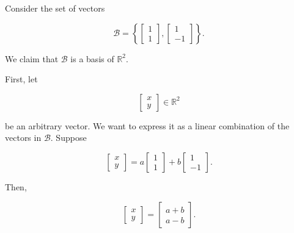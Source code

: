 \begin{example}
	Consider the set of vectors

	\begin{equation}
		\mathcal{B}
		=
		\left\{
		\begin{bmatrix}
			1 \\
			1
		\end{bmatrix},
		\begin{bmatrix}
			1 \\
			-1
		\end{bmatrix}
		\right\}.
		\label{eq:basis-and-dimension-of-r-15}
	\end{equation}

	We claim that \(\mathcal{B}\) is a basis of \(\mathbb{R}^2\).

	First, let

	\begin{equation}
		\begin{bmatrix}
			x \\
			y
		\end{bmatrix}
		\in \mathbb{R}^2
		\label{eq:basis-and-dimension-of-r-16}
	\end{equation}

	be an arbitrary vector. We want to express it as a linear combination of the
	vectors in \(\mathcal{B}\). Suppose

	\begin{equation}
		\begin{bmatrix}
			x \\
			y
		\end{bmatrix}
		=
		a
		\begin{bmatrix}
			1 \\
			1
		\end{bmatrix}
		+
		b
		\begin{bmatrix}
			1 \\
			-1
		\end{bmatrix}.
		\label{eq:basis-and-dimension-of-r-17}
	\end{equation}

	Then,

	\begin{equation}
		\begin{bmatrix}
			x \\
			y
		\end{bmatrix}
		=
		\begin{bmatrix}
			a+b \\
			a-b
		\end{bmatrix}.
		\label{eq:basis-and-dimension-of-r-18}
	\end{equation}


\end{example}
